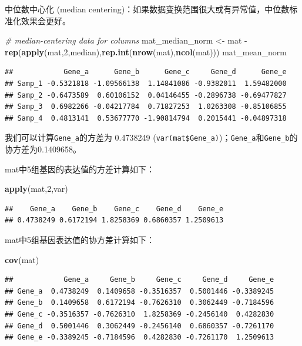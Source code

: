 \documentclass[]{article}
\newenvironment{Shaded}{\begin{snugshade}}{\end{snugshade}}
\newcommand{\KeywordTok}[1]{\textcolor[rgb]{0.13,0.29,0.53}{\textbf{{#1}}}}
\newcommand{\DecValTok}[1]{\textcolor[rgb]{0.00,0.00,0.81}{{#1}}}
\newcommand{\StringTok}[1]{\textcolor[rgb]{0.31,0.60,0.02}{{#1}}}
\newcommand{\CommentTok}[1]{\textcolor[rgb]{0.56,0.35,0.01}{\textit{{#1}}}}
\newcommand{\NormalTok}[1]{{#1}}
\numberwithin{figure}{section}
\numberwithin{table}{section}
\theoremstyle{definition}
\theoremstyle{definition}
\theoremstyle{definition}
\theoremstyle{remark}
\begin{document}
中位数中心化 (median
centering)：如果数据变换范围很大或有异常值，中位数标准化效果会更好。

\begin{Shaded}
\begin{Highlighting}[]
\CommentTok{# median-centering data for columns}
\NormalTok{mat_median_norm <-}\StringTok{ }\NormalTok{mat -}\StringTok{ }\KeywordTok{rep}\NormalTok{(}\KeywordTok{apply}\NormalTok{(mat,}\DecValTok{2}\NormalTok{,median),}\KeywordTok{rep.int}\NormalTok{(}\KeywordTok{nrow}\NormalTok{(mat),}\KeywordTok{ncol}\NormalTok{(mat)))}
\NormalTok{mat_mean_norm}
\end{Highlighting}
\end{Shaded}

\begin{verbatim}
##            Gene_a      Gene_b      Gene_c     Gene_d      Gene_e
## Samp_1 -0.5321818 -1.09566138  1.14841086 -0.9382011  1.59482000
## Samp_2 -0.6473589  0.60106152  0.04146455 -0.2896738 -0.69477827
## Samp_3  0.6982266 -0.04217784  0.71827253  1.0263308 -0.85106855
## Samp_4  0.4813141  0.53677770 -1.90814794  0.2015441 -0.04897318
\end{verbatim}

我们可以计算\texttt{Gene\_a}的方差为 0.4738249
(\texttt{var(mat\$Gene\_a)})；\texttt{Gene\_a}和\texttt{Gene\_b}的协方差为0.1409658。

mat中5组基因的表达值的方差计算如下：

\begin{Shaded}
\begin{Highlighting}[]
\KeywordTok{apply}\NormalTok{(mat,}\DecValTok{2}\NormalTok{,var)}
\end{Highlighting}
\end{Shaded}

\begin{verbatim}
##    Gene_a    Gene_b    Gene_c    Gene_d    Gene_e 
## 0.4738249 0.6172194 1.8258369 0.6860357 1.2509613
\end{verbatim}

mat中5组基因表达值的协方差计算如下：

\begin{Shaded}
\begin{Highlighting}[]
\KeywordTok{cov}\NormalTok{(mat)}
\end{Highlighting}
\end{Shaded}

\begin{verbatim}
##            Gene_a     Gene_b     Gene_c     Gene_d     Gene_e
## Gene_a  0.4738249  0.1409658 -0.3516357  0.5001446 -0.3389245
## Gene_b  0.1409658  0.6172194 -0.7626310  0.3062449 -0.7184596
## Gene_c -0.3516357 -0.7626310  1.8258369 -0.2456140  0.4282830
## Gene_d  0.5001446  0.3062449 -0.2456140  0.6860357 -0.7261170
## Gene_e -0.3389245 -0.7184596  0.4282830 -0.7261170  1.2509613
\end{verbatim}
\end{document}
